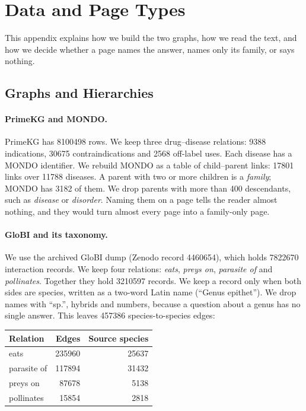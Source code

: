 \section{Data and Page Types}
\label{app:data}

This appendix explains how we build the two graphs, how we read the text, and how we decide whether a page names the answer, names only its family, or says nothing.

\subsection{Graphs and Hierarchies}

\paragraph{PrimeKG and MONDO.}
PrimeKG has \num{8100498} rows. We keep three drug--disease relations: \num{9388} indications, \num{30675} contraindications and \num{2568} off-label uses. Each disease has a MONDO identifier. We rebuild MONDO as a table of child--parent links: \num{17801} links over \num{11788} diseases. A parent with two or more children is a \emph{family}; MONDO has \num{3182} of them. We drop parents with more than 400 descendants, such as \emph{disease} or \emph{disorder}. Naming them on a page tells the reader almost nothing, and they would turn almost every page into a family-only page.

\paragraph{GloBI and its taxonomy.}
We use the archived GloBI dump (Zenodo record 4460654), which holds \num{7822670} interaction records. We keep four relations: \emph{eats}, \emph{preys on}, \emph{parasite of} and \emph{pollinates}. Together they hold \num{3210597} records. We keep a record only when both sides are species, written as a two-word Latin name (``Genus epithet''). We drop names with ``sp.'', hybrids and numbers, because a question about a genus has no single answer. This leaves \num{457386} species-to-species edges:

\begin{center}
\footnotesize
\begin{tabular}{@{}lrr@{}}
\toprule
Relation & Edges & Source species \\
\midrule
eats & \num{235960} & \num{25637} \\
parasite of & \num{117894} & \num{31432} \\
preys on & \num{87678} & \num{5138} \\
pollinates & \num{15854} & \num{2818} \\
\bottomrule
\end{tabular}
\end{center}

